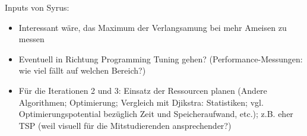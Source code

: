 Inputs von Syrus: \\

\begin{itemize}
\item Interessant wäre, das Maximum der Verlangsamung bei mehr Ameisen zu messen
\item Eventuell in Richtung Programming Tuning gehen? (Performance-Messungen: wie viel fällt auf welchen Bereich?) 
\item Für die Iterationen 2 und 3: Einsatz der Ressourcen planen (Andere Algorithmen; Optimierung; Vergleich mit Djikstra: Statistiken; vgl. Optimierungspotential bezüglich Zeit und Speicheraufwand, etc.); z.B. eher TSP (weil visuell für die Mitstudierenden ansprechender?) 
\end{itemize}